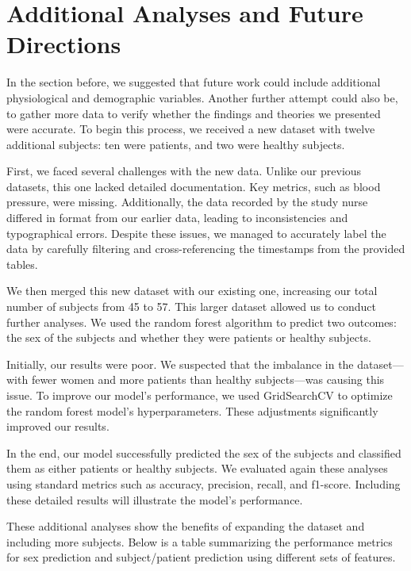 \section{Additional Analyses and Future Directions}

In the section before, we suggested that future work could include additional physiological and demographic variables. Another further attempt could also be, to gather more data to verify whether the findings and theories we presented were accurate. To begin this process, we received a new dataset with twelve additional subjects: ten were patients, and two were healthy subjects.

First, we faced several challenges with the new data. Unlike our previous datasets, this one lacked detailed documentation. Key metrics, such as blood pressure, were missing. Additionally, the data recorded by the study nurse differed in format from our earlier data, leading to inconsistencies and typographical errors. Despite these issues, we managed to accurately label the data by carefully filtering and cross-referencing the timestamps from the provided tables.

We then merged this new dataset with our existing one, increasing our total number of subjects from 45 to 57. This larger dataset allowed us to conduct further analyses. We used the random forest algorithm to predict two outcomes: the sex of the subjects and whether they were patients or healthy subjects.

Initially, our results were poor. We suspected that the imbalance in the dataset—with fewer women and more patients than healthy subjects—was causing this issue. To improve our model's performance, we used GridSearchCV to optimize the random forest model's hyperparameters. These adjustments significantly improved our results.

In the end, our model successfully predicted the sex of the subjects and classified them as either patients or healthy subjects. We evaluated again these analyses using standard metrics such as accuracy, precision, recall, and f1-score. Including these detailed results will illustrate the model's performance.

These additional analyses show the benefits of expanding the dataset and including more subjects. Below is a table summarizing the performance metrics for sex prediction and subject/patient prediction using different sets of features.

